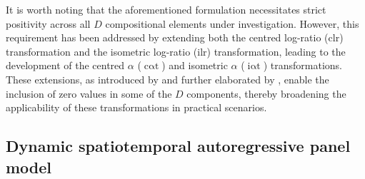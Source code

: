 \documentclass[12pt]{article}
\theoremstyle{plain}
\theoremstyle{definition}
\DeclareMathOperator{\ailr}{i\alpha t}
\DeclareMathOperator{\aclr}{c\alpha t}
\begin{document}
It is worth noting that the aforementioned formulation necessitates strict positivity across all $D$ compositional elements under investigation. However, this requirement has been addressed by extending both the centred log-ratio (clr) transformation and the isometric log-ratio (ilr) transformation, leading to the development of the centred $\alpha$ ($\aclr$) and isometric $\alpha$ ($\ailr$) transformations. These extensions, as introduced by \citet{Tsagris2016} and further elaborated by \citet{CLAROTTO2022100570}, enable the inclusion of zero values in some of the $D$ components, thereby broadening the applicability of these transformations in practical scenarios.

\subsection{Dynamic spatiotemporal autoregressive panel model}\label{sec:methods}
\end{document}
